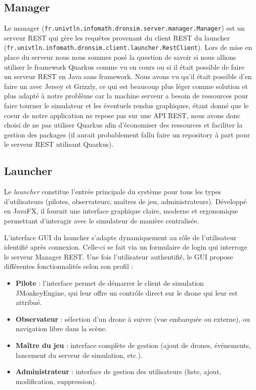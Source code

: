 \documentclass{scrartcl}
\begin{document}
\subsection{Manager}
Le manager (\texttt{fr.univtln.infomath.dronsim.server.manager.Manager}) est un serveur REST qui gère
les requêtes provenant du client REST du launcher \\(\texttt{fr.univtln.infomath.dronsim.client.launcher.RestClient}).
Lors de mise en place du serveur nous nous sommes posé la question de savoir si nous allions utiliser le framework Quarkus
comme vu en cours ou si il était possible de faire un serveur REST en Java sans framework. Nous avons vu qu'il était possible
d'en faire un avec Jersey et Grizzly, ce qui est beaucoup plus léger comme solution et plus adapté à notre problème
car la machine serveur a besoin de ressources pour faire tourner le simulateur et les éventuels rendus graphiques, étant donné que
le coeur de notre application ne repose pas sur une API REST, nous avons donc choisi de ne pas utiliser Quarkus afin d'économiser des ressources
et faciliter la gestion des packages (il aurait probablement fallu faire un repository à part pour le serveur REST utilisant Quarkus).


\subsection{Launcher}
Le \textit{launcher} constitue l'entrée principale du système pour tous les types d'utilisateurs (pilotes, observateurs, maîtres de jeu, administrateurs). Développé en JavaFX, il fournit une interface graphique claire, moderne et ergonomique permettant d'interagir avec le simulateur de manière centralisée.

L'interface GUI du launcher s'adapte dynamiquement au rôle de l'utilisateur identifié après connexion. Celle-ci se fait via un formulaire de login qui interroge le serveur Manager REST. Une fois l'utilisateur authentifié, le GUI propose différentes fonctionnalités selon son profil :
\begin{itemize}
    \item \textbf{Pilote} : l'interface permet de démarrer le client de simulation JMonkeyEngine, qui leur offre un contrôle direct sur le drone qui leur est attribué.
    \item \textbf{Observateur} : sélection d'un drone à suivre (vue embarquée ou externe), ou navigation libre dans la scène.
    \item \textbf{Maître du jeu} : interface complète de gestion (ajout de drones, événements, lancement du serveur de simulation, etc.).
    \item \textbf{Administrateur} : interface de gestion des utilisateurs (liste, ajout, modification, suppression).
\end{itemize}
\end{document}
